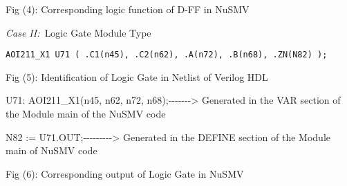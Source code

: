 \documentclass[a4paper]{article}
\begin{document}
\bigskip


\bigskip


\bigskip


\bigskip


\bigskip


\bigskip


\bigskip


\bigskip

{\centering\color[rgb]{0.0,0.0,0.039215688}
\textrm{Fig (4): Corresponding logic function of D-FF in NuSMV}
\par}


\bigskip

{\color[rgb]{0.0,0.0,0.039215688}
\textrm{\textit{Case II:\ }}\textrm{Logic Gate Module Type\ }}



\begin{center}
\begin{minipage}{5.90139in}
{\color[rgb]{0.0,0.0,0.039215688}
\texttt{AOI211\_X1 U71 ( .C1(n45), .C2(n62), .A(n72), .B(n68), .ZN(N82)
);}}
\end{minipage}
\end{center}

\bigskip

{\centering\rmfamily\color[rgb]{0.0,0.0,0.039215688}
Fig (5): Identification of Logic Gate in Netlist of Verilog HDL
\par}

{\centering \par}

\begin{center}
\begin{minipage}{5.90139in}
{\ttfamily\color[rgb]{0.0,0.0,0.039215688}
U71: AOI211\_X1(n45, n62, n72, n68);-{}-{}-{}-{}-{}-{}-{\textgreater}
Generated in the VAR section of the Module main of the NuSMV code\ }

{\ttfamily\color[rgb]{0.0,0.0,0.039215688}
N82 := U71.OUT;-{}-{}-{}-{}-{}-{}-{}-{}-{\textgreater} Generated in the
DEFINE section of the Module main of NuSMV code\ }


\bigskip
\end{minipage}
\end{center}

\bigskip


\bigskip

{\centering\color[rgb]{0.0,0.0,0.039215688}
\textrm{Fig (6): Corresponding output of Logic Gate in NuSMV}
\par}

{\centering \par}
\end{document}
